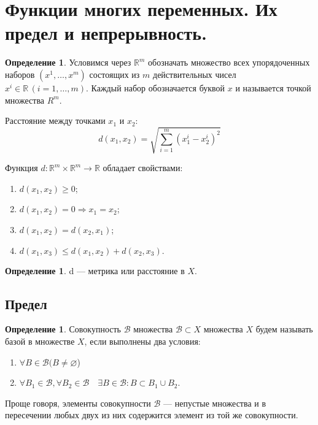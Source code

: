 \documentclass[12pt]{report}
\theoremstyle{definition}
\newtheorem{definition}[theorem]{Определение}
\newcommand{\R}{\mathbb R}
\newcommand{\B}{\mathcal B}
\begin{document}

\section{Функции многих переменных. Их предел и непрерывность.}

\begin{definition}
Условимся через $\R^m$ обозначать множество всех упорядоченных
наборов $(x^1, \dots, x^m)$ состоящих из $m$ действительных
чисел $x^i \in \R\,(i=1,\dots,m)$. Каждый набор обозначается буквой $x$
и называется точкой множества $R^m$.
\end{definition}

Расстояние между точками $x_1$ и $x_2$:
$$
d(x_1, x_2) = \sqrt{ \sum\limits_{i=1}^{m} (x_1^i - x_2^i)^2 }
$$

Функция $d: \R^m \times \R^m \rightarrow \R$ обладает свойствами:
\begin{enumerate}
\item $d(x_1, x_2) \ge 0$;
\item $d(x_1, x_2) = 0 \Rightarrow x_1 = x_2$;
\item $d(x_1, x_2) = d(x_2, x_1)$;
\item $d(x_1, x_3) \le d(x_1, x_2) + d(x_2, x_3).$
\end{enumerate}

\begin{definition}
d --- метрика или расстояние в $X$.
\end{definition}

\subsection{Предел}
\begin{definition}
Совокупность $\B$ множества $\B \subset X$ множества $X$ будем называть
базой в множестве $X$, если выполнены два условия:
\begin{enumerate}
\item $\forall B \in \B (B \ne \varnothing$)
\item $\forall B_1 \in \B, \forall B_2 \in \B \quad \exists B \in \B: B \subset B_1 \cup B_2$.
\end{enumerate}

Проще говоря, элементы совокупности $\B$ --- непустые множества и в пересечении любых
двух из них содержится элемент из той же совокупности.
\end{definition}
\end{document}
